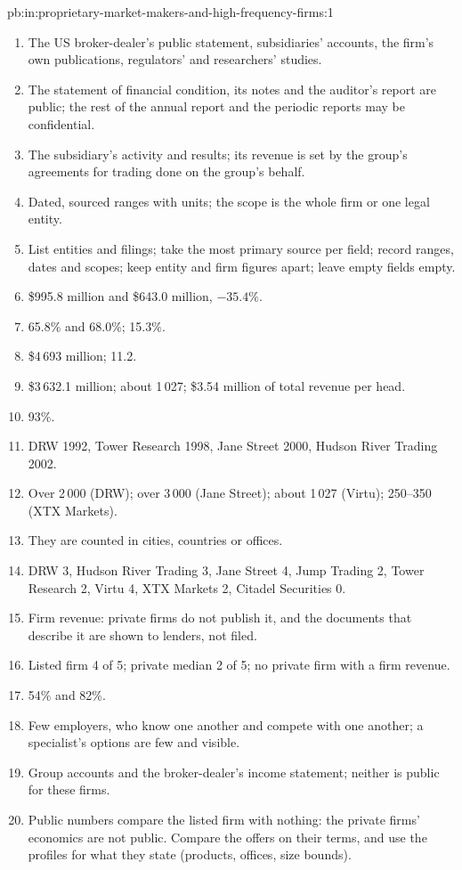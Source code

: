 \begin{solution}{pb:in:proprietary-market-makers-and-high-frequency-firms:1}
\begin{enumerate}
\item The US broker-dealer's public statement, subsidiaries' accounts, the firm's own publications, regulators' and
researchers' studies.
\item The statement of financial condition, its notes and the auditor's report are public; the rest of the annual report
and the periodic reports may be confidential.
\item The subsidiary's activity and results; its revenue is set by the group's agreements for trading done on the
group's behalf.
\item Dated, sourced ranges with units; the scope is the whole firm or one legal entity.
\item List entities and filings; take the most primary source per field; record ranges, dates and scopes; keep entity
and firm figures apart; leave empty fields empty.
\item \$995.8 million and \$643.0 million, $-35.4\%$.
\item 65.8\% and 68.0\%; 15.3\%.
\item \$4\,693 million; 11.2.
\item \$3\,632.1 million; about 1\,027; \$3.54 million of total revenue per head.
\item 93\%.
\item DRW 1992, Tower Research 1998, Jane Street 2000, Hudson River Trading 2002.
\item Over 2\,000 (DRW); over 3\,000 (Jane Street); about 1\,027 (Virtu); 250--350 (XTX Markets).
\item They are counted in cities, countries or offices.
\item DRW 3, Hudson River Trading 3, Jane Street 4, Jump Trading 2, Tower Research 2, Virtu 4, XTX Markets 2, Citadel
Securities 0.
\item Firm revenue: private firms do not publish it, and the documents that describe it are shown to lenders, not filed.
\item Listed firm 4 of 5; private median 2 of 5; no private firm with a firm revenue.
\item 54\% and 82\%.
\item Few employers, who know one another and compete with one another; a specialist's options are few and visible.
\item Group accounts and the broker-dealer's income statement; neither is public for these firms.
\item Public numbers compare the listed firm with nothing: the private firms' economics are not public. Compare the
offers on their terms, and use the profiles for what they state (products, offices, size bounds).
\end{enumerate}
\end{solution}

